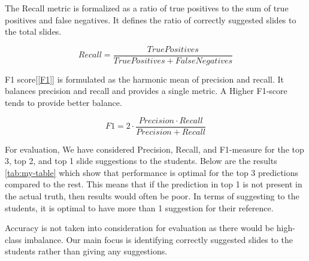 \documentclass[conference]{IEEEtran}
\begin{document}
{{The Recall metric is formalized as a ratio of true positives to the sum of true positives and false negatives\cite{dalianis2018evaluation}. It defines the ratio of correctly suggested slides to the total slides.

\begin{equation}\label{Recall}
    Recall = \frac{True Positives}{True Positives + False Negatives}
\end{equation}

F1 score[\ref{F1}] is formulated as the harmonic mean of precision and recall\cite{dalianis2018evaluation}. It balances precision and recall and provides a single metric. A Higher F1-score tends to provide better balance.

\begin{equation}\label{F1}
    F1 = 2 \cdot \frac{Precision \cdot Recall}{Precision + Recall}
\end{equation} 


For evaluation, We have considered Precision, Recall, and F1-measure for the top 3, top 2, and top 1 slide suggestions to the students. Below are the results \ref{tab:my-table} which show that performance is optimal for the top 3 predictions compared to the rest. This means that if the prediction in top 1 is not present in the actual truth, then results would often be poor. In terms of suggesting to the students, it is optimal to have more than 1 suggestion for their reference.

Accuracy is not taken into consideration for evaluation as there would be high-class imbalance. Our main focus is identifying correctly suggested slides to the students rather than giving any suggestions.


\begin{table}[ht!]
\centering
{}
\caption{Evaluation matrix for comparison between baseline and implemented system.}
\label{tab:my-table}
\end{table}


}}
\end{document}
